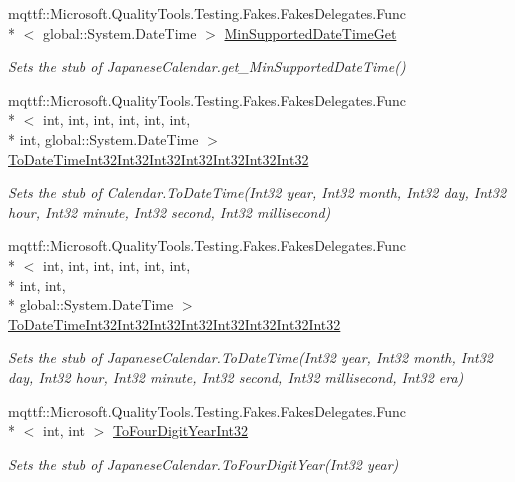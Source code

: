 \begin{DoxyCompactItemize}
mqttf\-::\-Microsoft.\-Quality\-Tools.\-Testing.\-Fakes.\-Fakes\-Delegates.\-Func\\*
$<$ global\-::\-System.\-Date\-Time $>$ \hyperlink{class_system_1_1_globalization_1_1_fakes_1_1_stub_japanese_calendar_ae04a999f8b59438efa836a256d4a4924}{Min\-Supported\-Date\-Time\-Get}
\begin{DoxyCompactList}\small\item\em Sets the stub of Japanese\-Calendar.\-get\-\_\-\-Min\-Supported\-Date\-Time()\end{DoxyCompactList}\item 
mqttf\-::\-Microsoft.\-Quality\-Tools.\-Testing.\-Fakes.\-Fakes\-Delegates.\-Func\\*
$<$ int, int, int, int, int, int, \\*
int, global\-::\-System.\-Date\-Time $>$ \hyperlink{class_system_1_1_globalization_1_1_fakes_1_1_stub_japanese_calendar_a2fc8f23bbbbeb998384cb694b86d903e}{To\-Date\-Time\-Int32\-Int32\-Int32\-Int32\-Int32\-Int32\-Int32}
\begin{DoxyCompactList}\small\item\em Sets the stub of Calendar.\-To\-Date\-Time(\-Int32 year, Int32 month, Int32 day, Int32 hour, Int32 minute, Int32 second, Int32 millisecond)\end{DoxyCompactList}\item 
mqttf\-::\-Microsoft.\-Quality\-Tools.\-Testing.\-Fakes.\-Fakes\-Delegates.\-Func\\*
$<$ int, int, int, int, int, int, \\*
int, int, \\*
global\-::\-System.\-Date\-Time $>$ \hyperlink{class_system_1_1_globalization_1_1_fakes_1_1_stub_japanese_calendar_afe3d0f416991b0c3808fbe55f09c4205}{To\-Date\-Time\-Int32\-Int32\-Int32\-Int32\-Int32\-Int32\-Int32\-Int32}
\begin{DoxyCompactList}\small\item\em Sets the stub of Japanese\-Calendar.\-To\-Date\-Time(\-Int32 year, Int32 month, Int32 day, Int32 hour, Int32 minute, Int32 second, Int32 millisecond, Int32 era)\end{DoxyCompactList}\item 
mqttf\-::\-Microsoft.\-Quality\-Tools.\-Testing.\-Fakes.\-Fakes\-Delegates.\-Func\\*
$<$ int, int $>$ \hyperlink{class_system_1_1_globalization_1_1_fakes_1_1_stub_japanese_calendar_a7fd71baeba7fafe30850ad03e4faadca}{To\-Four\-Digit\-Year\-Int32}
\begin{DoxyCompactList}\small\item\em Sets the stub of Japanese\-Calendar.\-To\-Four\-Digit\-Year(\-Int32 year)\end{DoxyCompactList}\item 

\end{DoxyCompactItemize}
